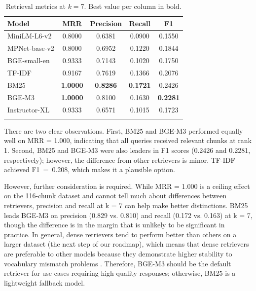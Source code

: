 \documentclass[pdflatex,sn-mathphys-num]{sn-jnl}
\theoremstyle{thmstyleone}
\theoremstyle{thmstyletwo}
\theoremstyle{thmstylethree}
\begin{document}
\begin{table}[h]
  \centering
  \caption{Retrieval metrics at $k=7$. Best value per column in bold.}
  \label{tab:results_k7}
  \begin{tabular}{@{}lcccc@{}}
    \toprule
    \textbf{Model} & \textbf{MRR} & \textbf{Precision} & \textbf{Recall} & \textbf{F1} \\
    \midrule
    MiniLM-L6-v2   & 0.8000          & 0.6381          & 0.0900          & 0.1550          \\
    MPNet-base-v2  & 0.8000          & 0.6952          & 0.1220          & 0.1844          \\
    BGE-small-en   & 0.9333          & 0.7143          & 0.1020          & 0.1750          \\
    TF-IDF         & 0.9167          & 0.7619          & 0.1366          & 0.2076          \\
    BM25           & \textbf{1.0000} & \textbf{0.8286} & \textbf{0.1721} & 0.2426          \\
    BGE-M3         & \textbf{1.0000} & 0.8100          & 0.1630          & \textbf{0.2281} \\
    Instructor-XL  & 0.9333          & 0.6571          & 0.1015          & 0.1723          \\
    \botrule
  \end{tabular}
\end{table}

There are two clear observations. First, BM25 and BGE-M3 performed equally well on MRR = 1.000, indicating that all queries received relevant chunks at rank 1. Second, BM25 and BGE-M3 were also leaders in F1 scores (0.2426 and 0.2281, respectively); however, the difference from other retrievers is minor. TF-IDF achieved F1~=~0.208, which makes it a plausible option.

However, further consideration is required. While MRR = 1.000 is a ceiling effect on the 116-chunk dataset and cannot tell much about differences between retrievers, precision and recall at k = 7 can help make better distinctions. BM25 leads BGE-M3 on precision (0.829 vs. 0.810) and recall (0.172 vs. 0.163) at k = 7, though the difference is in the margin that is unlikely to be significant in practice. In general, dense retrievers tend to perform better than others on a larger dataset (the next step of our roadmap), which means that dense retrievers are preferable to other models because they demonstrate higher stability to vocabulary mismatch problems \cite{thakur2021beir,chen2024bgem3}. Therefore, BGE-M3 should be the default retriever for use cases requiring high-quality responses; otherwise, BM25 is a lightweight fallback model.
\end{document}
